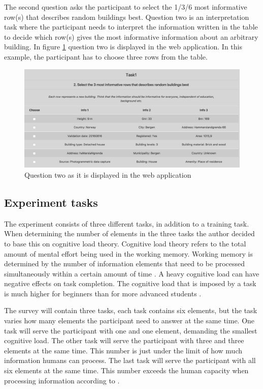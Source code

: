 The second question asks the participant to select the 1/3/6 most informative row(s) that describes random buildings best. Question two is an interpretation task where the participant needs to interpret the information written in the table to decide which row(s) gives the most informative information about an arbitrary building. In figure \ref{fig:q22} question two is displayed in the web application. In this example, the participant has to choose three rows from the table. 

\begin{figure}[H]
	\centering
	\includegraphics[width=0.8\linewidth]{fig/q2_2}
	\caption{Question two as it is displayed in the web application}
	\label{fig:q22}
\end{figure}

\subsection{Experiment tasks}\label{sec:experimenttasks}
The experiment consists of three different tasks, in addition to a training task. When determining the number of elements in the three tasks the author decided to base this on cognitive load theory. Cognitive load theory refers to the total amount of mental effort being used in the working memory. Working memory is determined by the number of information elements that need to be processed simultaneously within a certain amount of time \citep{Barrouillet2007}. A heavy cognitive load can have negative effects on task completion. The cognitive load that is imposed by a task is much higher for beginners than for more advanced students \citep{Leppink2014a}.  

The survey will contain three tasks, each task contains six elements, but the task varies how many elements the participant need to answer at the same time. One task will serve the participant with one and one element, demanding the smallest cognitive load. The other task will serve the participant with three and three elements at the same time. This number is just under the limit of how much information humans can process. The last task will serve the participant with all six elements at the same time. This number exceeds the human capacity when processing information according to \cite{Leppink2014a}. 

